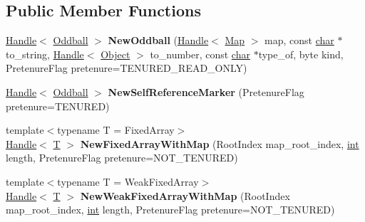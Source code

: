 \subsection*{Public Member Functions}
\begin{DoxyCompactItemize}
\item 
\mbox{\label{classv8_1_1internal_1_1Factory_a5e9cca1bbb55ee761dc030ef3c402651}} 
\mbox{\hyperlink{classv8_1_1internal_1_1Handle}{Handle}}$<$ \mbox{\hyperlink{classv8_1_1internal_1_1Oddball}{Oddball}} $>$ {\bfseries New\+Oddball} (\mbox{\hyperlink{classv8_1_1internal_1_1Handle}{Handle}}$<$ \mbox{\hyperlink{classv8_1_1internal_1_1Map}{Map}} $>$ map, const \mbox{\hyperlink{classchar}{char}} $\ast$to\+\_\+string, \mbox{\hyperlink{classv8_1_1internal_1_1Handle}{Handle}}$<$ \mbox{\hyperlink{classv8_1_1internal_1_1Object}{Object}} $>$ to\+\_\+number, const \mbox{\hyperlink{classchar}{char}} $\ast$type\+\_\+of, byte kind, Pretenure\+Flag pretenure=T\+E\+N\+U\+R\+E\+D\+\_\+\+R\+E\+A\+D\+\_\+\+O\+N\+LY)
\item 
\mbox{\label{classv8_1_1internal_1_1Factory_a8d8e5bb54220125b6b3e1ea7690ef267}} 
\mbox{\hyperlink{classv8_1_1internal_1_1Handle}{Handle}}$<$ \mbox{\hyperlink{classv8_1_1internal_1_1Oddball}{Oddball}} $>$ {\bfseries New\+Self\+Reference\+Marker} (Pretenure\+Flag pretenure=T\+E\+N\+U\+R\+ED)
\item 
\mbox{\label{classv8_1_1internal_1_1Factory_a183594979e16668e862e3db791e9ed53}} 
{\footnotesize template$<$typename T  = Fixed\+Array$>$ }\\\mbox{\hyperlink{classv8_1_1internal_1_1Handle}{Handle}}$<$ \mbox{\hyperlink{classv8_1_1internal_1_1torque_1_1T}{T}} $>$ {\bfseries New\+Fixed\+Array\+With\+Map} (Root\+Index map\+\_\+root\+\_\+index, \mbox{\hyperlink{classint}{int}} length, Pretenure\+Flag pretenure=N\+O\+T\+\_\+\+T\+E\+N\+U\+R\+ED)
\item 
\mbox{\label{classv8_1_1internal_1_1Factory_aaa97a68bc10006439945cde9f1a4a913}} 
{\footnotesize template$<$typename T  = Weak\+Fixed\+Array$>$ }\\\mbox{\hyperlink{classv8_1_1internal_1_1Handle}{Handle}}$<$ \mbox{\hyperlink{classv8_1_1internal_1_1torque_1_1T}{T}} $>$ {\bfseries New\+Weak\+Fixed\+Array\+With\+Map} (Root\+Index map\+\_\+root\+\_\+index, \mbox{\hyperlink{classint}{int}} length, Pretenure\+Flag pretenure=N\+O\+T\+\_\+\+T\+E\+N\+U\+R\+ED)

\end{DoxyCompactItemize}
